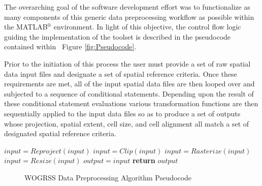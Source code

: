 The overarching goal of the software development effort was to functionalize as many components of this generic data preprocessing workflow as possible within the MATLAB$^{\circledR}$ environment. In light of this objective, the control flow logic guiding the implementation of the toolset is described in the pseudocode contained within ~Figure \ref{fig:Pseudocode}. 

Prior to the initiation of this process the user must provide a set of raw spatial data input files and designate a set of spatial reference criteria. Once these requirements are met, all of the input spatial data files are then looped over and subjected to a sequence of conditional statements. Depending upon the result of these conditional statement evaluations various transformation functions are then sequentially applied to the input data files so as to produce a set of outputs whose projection, spatial extent, cell size, and cell alignment all match a set of designated spatial reference criteria.



                \begin{algorithm}
                \caption{}\label{euclid}
                \begin{algorithmic}[1]
                                \State $input = Reproject(input)$
                                \State $input = Clip(input)$
                                \State $input = Rasterize(input)$
                                \State $input = Resize(input)$
                            \EndIf
                            \State $output = input$
                        \EndFor
                        \State \textbf{return} $output$
                    \EndProcedure
                \end{algorithmic}
                \end{algorithm}
                
            \begin{figure}[WOGRSS Data Preprocessing Algorithm Pseudocode]
            \caption[WOGRSS Data Preprocessing Algorithm Pseudocode]{WOGRSS Data Preprocessing Algorithm Pseudocode}
            \label{fig:wogrss-pseudocode}
            \end{figure}

